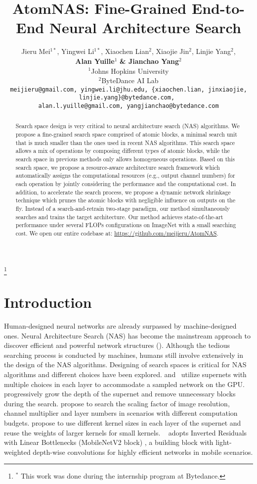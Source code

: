 \documentclass{article} \usepackage{iclr2020_conference,times}
\title{AtomNAS: Fine-Grained End-to-End Neural Architecture Search}
\author{Jieru Mei$^{1 {\ast}}$, Yingwei Li$^{1 {\ast}}$, Xiaochen Lian$^2$, Xiaojie Jin$^2$, Linjie Yang$^2$, \\\textbf{Alan Yuille$^1$} \textbf{\& Jianchao Yang$^2$} \\
$^1$Johns Hopkins University\\
$^2$ByteDance AI Lab\\
\texttt{\tiny meijieru@gmail.com, yingwei.li@jhu.edu, \{xiaochen.lian, jinxiaojie, linjie.yang\}@bytedance.com, } \\
\texttt{\tiny alan.l.yuille@gmail.com, yangjianchao@bytedance.com}
}
\newcommand{\flops}{FLOPs\xspace}
\begin{document}
\maketitle

\begin{abstract}


Search space design is very critical to neural architecture search (NAS) algorithms. We propose a fine-grained search space comprised of atomic blocks, a minimal search unit that is much smaller than the ones used in recent NAS algorithms.
This search space allows a mix of operations by composing different types of atomic blocks, while the search space in previous methods only allows homogeneous operations. Based on this search space, we propose a resource-aware architecture search framework which automatically assigns the computational resources (e.g., output channel numbers) for each operation by jointly considering the performance and the computational cost. In addition, to accelerate the search process, we propose a dynamic network shrinkage technique which prunes the atomic blocks with negligible influence on outputs on the fly. 
Instead of a search-and-retrain two-stage paradigm, our method simultaneously searches and trains the target architecture. 
Our method achieves state-of-the-art performance under several \flops configurations on ImageNet with a small searching cost.
We open our entire codebase at: \url{https://github.com/meijieru/AtomNAS}.

\end{abstract}

\let\thefootnote\relax\footnote{$^\ast$ This work was done during the internship program at Bytedance.}

\section{Introduction}

Human-designed neural networks are already surpassed by machine-designed ones. Neural Architecture Search (NAS) has become the mainstream approach to discover efficient and powerful network structures (\cite{zoph2017nasnet, hieu2018enas, tan2019mnasnet, hanxiao2019darts}). Although the tedious searching process is conducted by machines, humans still involve extensively in the design of the NAS algorithms. Designing of search spaces is critical for NAS algorithms and different choices have been explored. \cite{han2019proxyless} and~\cite{wu2019fbnet} utilize supernets with multiple choices in each layer to accommodate a sampled network on the GPU. \cite{chen2019pdarts} progressively grow the depth of the supernet and remove unnecessary blocks during the search. \cite{mingxing2019efficient} propose to search the scaling factor of image resolution, channel multiplier and layer numbers in scenarios with different computation budgets. \cite{stamoulis2019single_path} propose to use different kernel sizes in each layer of the supernet and reuse the weights of larger kernels for small kernels. ~\cite{howard2019mobilenetv3,tan2019mixnet} adopts Inverted Residuals with Linear Bottlenecks (MobileNetV2 block) \citep{sandler2018mobilenetv2}, a building block with light-weighted depth-wise convolutions for highly efficient networks in mobile scenarios. 
\end{document}
